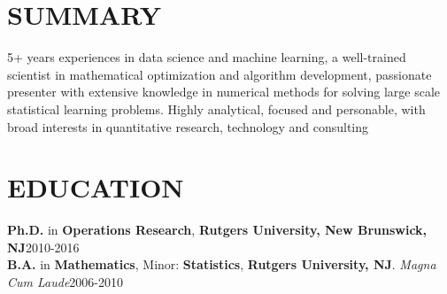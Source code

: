 \documentclass[10.5pt]{res} %
\begin{document}
\address{%
\quad Phone: (732) 447-6825~~E-mail:~~yaowang74\footnotesize{\MVAt}\normalsize{gmail.com}
~~Work Authorization: U.S. Citizen}%


\begin{resume}


\section{SUMMARY}
5+ years experiences in data science and machine learning, a well-trained scientist in mathematical optimization and algorithm development, passionate presenter with extensive knowledge in numerical methods for solving large scale statistical learning problems. Highly analytical, focused and personable, with broad interests in quantitative research, technology and consulting

\section{EDUCATION}
                \textbf{Ph.D.} in \textbf{Operations Research}, \textbf{Rutgers University, New Brunswick, NJ}\hfill 2010-2016\\
                \textbf{B.A.} in \textbf{Mathematics}, Minor: \textbf{Statistics}, \textbf{Rutgers University, NJ}. \emph{Magna Cum Laude}\hfill 2006-2010
%

\end{resume}
\end{document}
